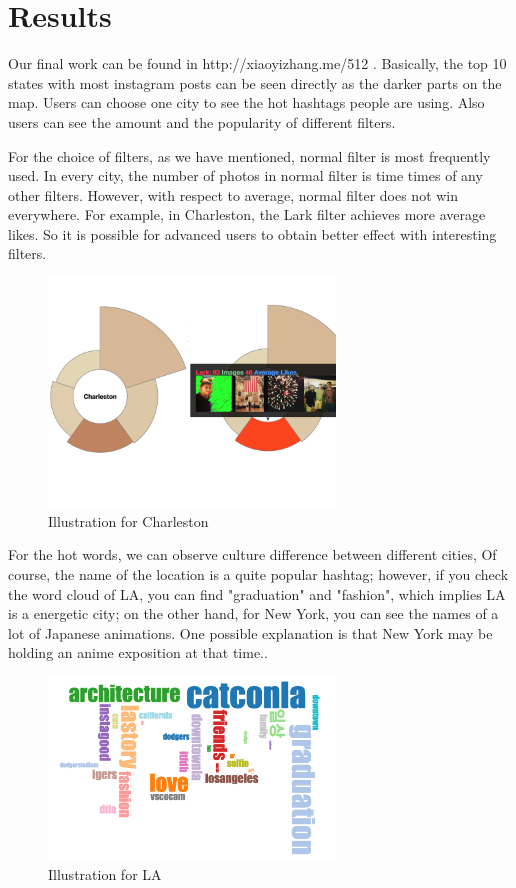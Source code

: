 \documentclass[conference]{acmsiggraph}
\begin{document}
\section{Results}
Our final work can be found in http://xiaoyizhang.me/512 . Basically, the top 10 states with most instagram posts can be seen directly as the darker parts on the map. Users can choose one city to see the hot hashtags people are  using. Also users can see the amount and the popularity of different filters.

For the choice of filters, as we have mentioned, normal filter is most frequently used. In every city, the number of photos in  normal filter is time times of any other filters. However, with respect to average, normal filter does not win everywhere. For example, in  Charleston, the Lark filter achieves more average likes. So it is possible for advanced users to obtain better effect with interesting filters. 

\begin{figure}[ht]
  \centering
\includegraphics[width=3in]{images/c}
  \caption{Illustration for Charleston}
  \label{like-filter}
\end{figure}


For the hot words, we can observe culture difference between different cities, Of course, the name of the location is a quite popular hashtag; however, if you check the word cloud of LA, you can find "graduation" and "fashion", which implies LA is a energetic city; on the other hand, for New York, you can see the names of a lot of Japanese animations. One possible explanation is that New York may be holding an anime exposition at that time..  

\begin{figure}[ht]
  \centering
\includegraphics[width=3in]{images/la}
  \caption{Illustration for LA}
  \label{like-filter}
\end{figure}
\end{document}
